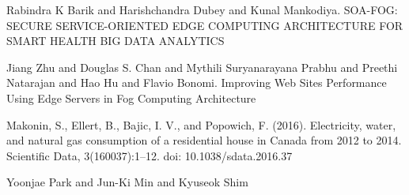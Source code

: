 \documentclass[11pt,journal, a4paper]{IEEEtran}
\begin{document}
\begin{thebibliography}{11}
Rabindra K Barik and Harishchandra Dubey and Kunal Mankodiya. SOA-FOG: SECURE SERVICE-ORIENTED EDGE COMPUTING ARCHITECTURE FOR SMART HEALTH BIG DATA ANALYTICS

Jiang Zhu and Douglas S. Chan and Mythili Suryanarayana Prabhu and Preethi Natarajan and Hao Hu and Flavio Bonomi. Improving Web Sites Performance Using Edge Servers in Fog Computing Architecture

Makonin, S., Ellert, B., Bajic, I. V., and Popowich, F. (2016). Electricity, water, and natural gas consumption of a residential house in Canada from 2012 to 2014. Scientific Data, 3(160037):1–12. doi: 10.1038/sdata.2016.37


Yoonjae Park and Jun-Ki Min and Kyuseok Shim

\end{thebibliography}
\end{document}
